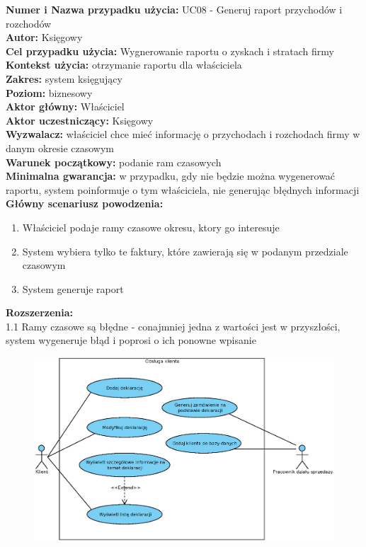 \textbf{Numer i Nazwa przypadku użycia:} UC08 - Generuj raport przychodów i rozchodów \\
\textbf{Autor:} Księgowy\\
\textbf{Cel przypadku użycia:} Wygnerowanie raportu o zyskach i stratach firmy \\
\textbf{Kontekst użycia:} otrzymanie raportu dla właściciela  \\
\textbf{Zakres:} system księgujący \\
\textbf{Poziom:} biznesowy \\
\textbf{Aktor główny:} Właściciel \\
\textbf{Aktor uczestniczący:} Księgowy \\
\textbf{Wyzwalacz:} właściciel chce mieć informację o przychodach i rozchodach firmy w danym okresie czasowym \\
\textbf{Warunek początkowy:} podanie ram czasowych  \\
\textbf{Minimalna gwarancja:} w przypadku, gdy nie będzie można wygenerować raportu, system poinformuje o tym właściciela, nie generując błędnych informacji \\
\textbf{Główny scenariusz powodzenia:} 
	\begin{enumerate}
		\item Właściciel podaje ramy czasowe okresu, ktory go interesuje
		\item System wybiera tylko te faktury, które zawierają się w podanym przedziale czasowym
		\item System generuje raport
	\end{enumerate}
\textbf{Rozszerzenia:} \\
1.1 Ramy czasowe są błędne - conajmniej jedna z wartości jest w przyszłości, system wygeneruje błąd i poprosi o ich ponowne wpisanie


\begin{figure}[H]
	\centering
	\includegraphics[width=1.1\textwidth]{img/UC/deklaracje.eps}
\end{figure}

